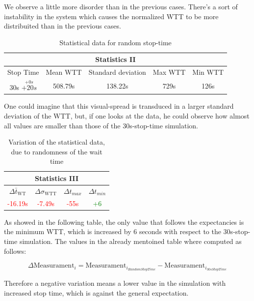 \documentclass[11pt]{article}
\newcommand{\red}[1]{\textcolor{red}{#1}}
\newcommand{\green}[1]{\textcolor{green}{#1}}
\begin{document}
We observe a little more disorder than in the previous cases. There's a sort of instability in the system which causes the normalized WTT to be more distribuited than in the previous cases.

\begin{table}
\begin{center}
\begin{tabular}{c|c|c|c|c}
\multicolumn{5}{c}{Statistics II}\\
\hline
\hline
Stop Time				&Mean WTT	&Standard deviation		&Max WTT	&Min WTT	\\
\hline
30s	$\stackrel{+0s}{+20s}$	&508.79s	&138.22s				&729s		&126s\\
\hline
\end{tabular}
\end{center}
\caption{Statistical data for random stop-time}
\end{table}

One could imagine that this visual-spread is transduced in a larger standard deviation of the WTT, but, if one looks at the data, he could observe how almost all values are smaller than those of the 30s-stop-time simulation.

\begin{table}
\begin{center}
\begin{tabular}{c|c|c|c}
\multicolumn{4}{c}{Statistics III}\\
\hline
\hline
$\Delta\bar{t}_\text{WT}$	&$\Delta \sigma_\text{WTT}$	&$\Delta t_{max}$	&$\Delta t_{min}$\\
\hline
\red{-16.19s}			&\red{-7.49s}				&\red{-55s}		&\green{+6}\\
\hline
\end{tabular}
\end{center}
\caption{Variation of the statistical data, due to randomness of the wait time}
\end{table}

As showed in the following table, the only value that follows the expectancies is the minimum WTT, which is increased by 6 seconds with respect to the 30s-stop-time simulation. The values in the already mentoined table where computed as follows:

\begin{equation*}
	\Delta\text{Measurament}_i = \text{Measurament}_{i_{RandomStopTime}} - \text{Measurament}_{i_{30sStopTime}}
\end{equation*}

Therefore a negative variation means a lower value in the simulation with increased stop time, which is against the general expectation.
\end{document}
